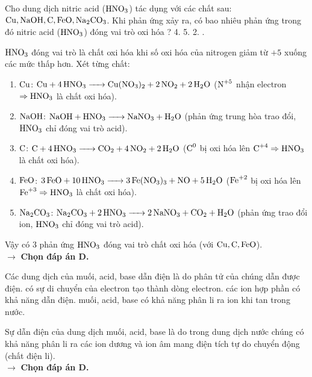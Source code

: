 \documentclass[11pt,a4paper]{article}
\begin{document}
\begin{ex}%
Cho dung dịch nitric acid ($\ce{HNO3}$) tác dụng với các chất sau: $\ce{Cu, NaOH, C, FeO, Na2CO3}$. Khi phản ứng xảy ra, có bao nhiêu phản ứng trong đó nitric acid ($\ce{HNO3}$) đóng vai trò oxi hóa ?
\choice
{4.}
{5.}
{2.}
{.}
\begin{loigiai}
$\ce{HNO3}$ đóng vai trò là chất oxi hóa khi số oxi hóa của nitrogen giảm từ $+5$ xuống các mức thấp hơn. Xét từng chất:
\begin{enumerate}
\item $\ce{Cu}$: $\ce{Cu + 4HNO3 -> Cu(NO3)2 + 2NO2 + 2H2O}$ ($\ce{N^{+5}}$ nhận electron $\Rightarrow \ce{HNO3}$ là chất oxi hóa).
\item $\ce{NaOH}$: $\ce{NaOH + HNO3 -> NaNO3 + H2O}$ (phản ứng trung hòa trao đổi, $\ce{HNO3}$ chỉ đóng vai trò acid).
\item $\ce{C}$: $\ce{C + 4HNO3 -> CO2 + 4NO2 + 2H2O}$ ($\ce{C^0}$ bị oxi hóa lên $\ce{C^{+4}} \Rightarrow \ce{HNO3}$ là chất oxi hóa).
\item $\ce{FeO}$: $\ce{3FeO + 10HNO3 -> 3Fe(NO3)3 + NO + 5H2O}$ ($\ce{Fe^{+2}}$ bị oxi hóa lên $\ce{Fe^{+3}} \Rightarrow \ce{HNO3}$ là chất oxi hóa).
\item $\ce{Na2CO3}$: $\ce{Na2CO3 + 2HNO3 -> 2NaNO3 + CO2 + H2O}$ (phản ứng trao đổi ion, $\ce{HNO3}$ chỉ đóng vai trò acid).
\end{enumerate}
Vậy có 3 phản ứng $\ce{HNO3}$ đóng vai trò chất oxi hóa (với $\ce{Cu, C, FeO}$).\\
$\rightarrow$ \textbf{Chọn đáp án D.}
\end{loigiai}
\end{ex}

\begin{ex}%
Các dung dịch của muối, acid, base dẫn điện là do
\choice
{phân tử của chúng dẫn được điện.}
{có sự di chuyển của electron tạo thành dòng electron.}
{các ion hợp phần có khả năng dẫn điện.}
{\True muối, acid, base có khả năng phân li ra ion khi tan trong nước.}
\begin{loigiai}
Sự dẫn điện của dung dịch muối, acid, base là do trong dung dịch nước chúng có khả năng phân li ra các ion dương và ion âm mang điện tích tự do chuyển động (chất điện li).\\
$\rightarrow$ \textbf{Chọn đáp án D.}
\end{loigiai}
\end{ex}
\end{document}
